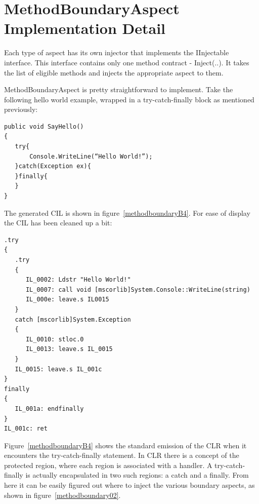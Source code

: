 \section{MethodBoundaryAspect Implementation Detail}

Each type of aspect has its own injector that implements the IInjectable interface. This interface contains only one method contract - Inject(..). It takes the list of eligible methods and injects the appropriate aspect to them.

MethodBoundaryAspect is pretty straightforward to implement. Take the following hello world example, wrapped in a try-catch-finally block as mentioned previously:

\begin{lstlisting}[caption={SayHello function}, label=sayhello]
public void SayHello()
{
   try{
       Console.WriteLine(“Hello World!”);
   }catch(Exception ex){
   }finally{
   }
}
\end{lstlisting}

The generated CIL is shown in figure~\ref{methodboundaryB4}. For ease of display the CIL has been cleaned up a bit:

\begin{lstlisting}[caption={CIL generated for sample C\# function}, label=methodboundaryB4]
.try
{
   .try
   {
      IL_0002: Ldstr "Hello World!"
      IL_0007: call void [mscorlib]System.Console::WriteLine(string)
      IL_000e: leave.s IL0015
   }
   catch [mscorlib]System.Exception
   {
      IL_0010: stloc.0
      IL_0013: leave.s IL_0015
   }
   IL_0015: leave.s IL_001c
}
finally
{
   IL_001a: endfinally
}
IL_001c: ret
\end{lstlisting}

Figure~\ref{methodboundaryB4} shows the standard emission of the CLR when it encounters the try-catch-finally statement. In CLR there is a concept of the protected region, where each region is associated with a handler. A try-catch-finally is actually encapsulated in two such regions: a catch and a finally. From here it can be easily figured out where to inject the various boundary aspects, as shown in figure~\ref{methodboundary02}.

